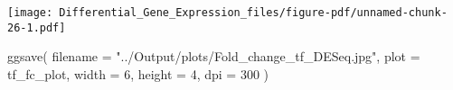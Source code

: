 \documentclass[
  letterpaper,
  DIV=11,
  numbers=noendperiod]{scrartcl}
\newenvironment{Shaded}{\begin{snugshade}}{\end{snugshade}}
\newcommand{\AttributeTok}[1]{\textcolor[rgb]{0.40,0.45,0.13}{#1}}
\newcommand{\DecValTok}[1]{\textcolor[rgb]{0.68,0.00,0.00}{#1}}
\newcommand{\FunctionTok}[1]{\textcolor[rgb]{0.28,0.35,0.67}{#1}}
\newcommand{\NormalTok}[1]{\textcolor[rgb]{0.00,0.23,0.31}{#1}}
\newcommand{\StringTok}[1]{\textcolor[rgb]{0.13,0.47,0.30}{#1}}
\begin{document}
\texttt{[image: Differential\_Gene\_Expression\_files/figure-pdf/unnamed-chunk-26-1.pdf]}

\begin{Shaded}
\begin{Highlighting}[]
\FunctionTok{ggsave}\NormalTok{(}
  \AttributeTok{filename =} \StringTok{"../Output/plots/Fold\_change\_tf\_DESeq.jpg"}\NormalTok{,   }
  \AttributeTok{plot =}\NormalTok{ tf\_fc\_plot,                      }
  \AttributeTok{width =} \DecValTok{6}\NormalTok{, }\AttributeTok{height =} \DecValTok{4}\NormalTok{,               }
  \AttributeTok{dpi =} \DecValTok{300}                            
\NormalTok{)}
\end{Highlighting}
\end{Shaded}
\end{document}
